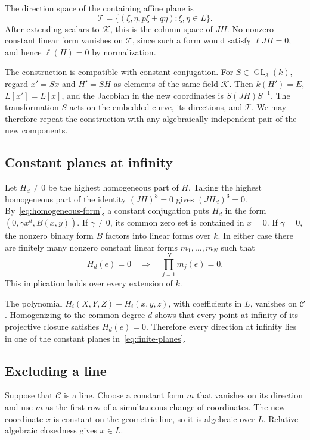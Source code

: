 \documentclass[11pt,reqno]{amsart}
\theoremstyle{definition}
\theoremstyle{remark}
\numberwithin{equation}{section}
\DeclareMathOperator{\GL}{GL}
\begin{document}
The direction space of the containing affine plane is
\begin{equation}\label{eq:tangent-plane}
 \mathcal T=\{(\xi,\eta,p\xi+q\eta):\xi,\eta\in L\}.
\end{equation}
After extending scalars to $\mathcal K$, this is the column space of $JH$. No nonzero constant linear form vanishes on $\mathcal T$, since such a form would satisfy $\ell JH=0$, and hence $\ell(H)=0$ by normalization.

The construction is compatible with constant conjugation. For $S\in\GL_3(k)$, regard $x'=Sx$ and $H'=SH$ as elements of the same field $\mathcal K$. Then $k(H')=E$, $L[x']=L[x]$, and the Jacobian in the new coordinates is $S(JH)S^{-1}$. The transformation $S$ acts on the embedded curve, its directions, and $\mathcal T$. We may therefore repeat the construction with any algebraically independent pair of the new components.

\subsection{Constant planes at infinity}
Let $H_d\neq0$ be the highest homogeneous part of $H$. Taking the highest homogeneous part of the identity $(JH)^3=0$ gives $(JH_d)^3=0$. By~\eqref{eq:homogeneous-form}, a constant conjugation puts $H_d$ in the form $(0,\gamma x^d,B(x,y))$. If $\gamma\neq0$, its common zero set is contained in $x=0$. If $\gamma=0$, the nonzero binary form $B$ factors into linear forms over $k$. In either case there are finitely many nonzero constant linear forms $m_1,\ldots,m_N$ such that
\begin{equation}\label{eq:finite-planes}
 H_d(e)=0\quad\Longrightarrow\quad\prod_{j=1}^N m_j(e)=0.
\end{equation}
This implication holds over every extension of $k$.

The polynomial $H_i(X,Y,Z)-H_i(x,y,z)$, with coefficients in $L$, vanishes on $\mathcal C$. Homogenizing to the common degree $d$ shows that every point at infinity of its projective closure satisfies $H_d(e)=0$. Therefore every direction at infinity lies in one of the constant planes in~\eqref{eq:finite-planes}.

\subsection{Excluding a line}
Suppose that $\mathcal C$ is a line. Choose a constant form $m$ that vanishes on its direction and use $m$ as the first row of a simultaneous change of coordinates. The new coordinate $x$ is constant on the geometric line, so it is algebraic over $L$. Relative algebraic closedness gives $x\in L$.
\end{document}
